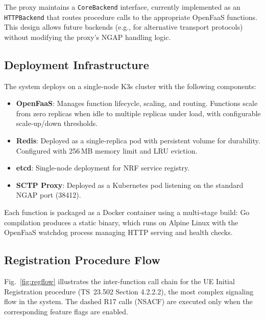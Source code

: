 \documentclass[conference]{IEEEtran}
\begin{document}
The proxy maintains a \texttt{CoreBackend} interface, currently implemented as an \texttt{HTTPBackend} that routes procedure calls to the appropriate OpenFaaS functions. This design allows future backends (e.g., for alternative transport protocols) without modifying the proxy's NGAP handling logic.

\subsection{Deployment Infrastructure}

The system deploys on a single-node K3s cluster with the following components:
\begin{itemize}
    \item \textbf{OpenFaaS}: Manages function lifecycle, scaling, and routing. Functions scale from zero replicas when idle to multiple replicas under load, with configurable scale-up/down thresholds.
    \item \textbf{Redis}: Deployed as a single-replica pod with persistent volume for durability. Configured with 256\,MB memory limit and LRU eviction.
    \item \textbf{etcd}: Single-node deployment for NRF service registry.
    \item \textbf{SCTP Proxy}: Deployed as a Kubernetes pod listening on the standard NGAP port (38412).
\end{itemize}

Each function is packaged as a Docker container using a multi-stage build: Go compilation produces a static binary, which runs on Alpine Linux with the OpenFaaS watchdog process managing HTTP serving and health checks.

\subsection{Registration Procedure Flow}

Fig.~\ref{fig:regflow} illustrates the inter-function call chain for the UE Initial Registration procedure (TS~23.502 Section 4.2.2.2), the most complex signaling flow in the system. The dashed R17 calls (NSACF) are executed only when the corresponding feature flags are enabled.
\end{document}
